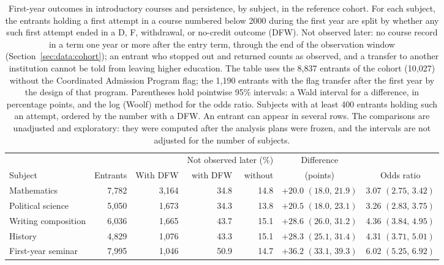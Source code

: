 \begin{table}[tbp]
\centering\footnotesize
\setlength{\tabcolsep}{4pt}
\caption{First-year outcomes in introductory courses and
  persistence, by subject, in the reference cohort. For each
  subject, the entrants holding a first attempt in a course
  numbered below 2000 during the first year are split by
  whether any such first attempt ended in a D, F, withdrawal, or
  no-credit outcome (DFW). Not observed later: no course record in
  a term one year or more after the entry term, through the end of
  the observation window (Section~\ref{sec:data:cohort}); an
  entrant who stopped out and returned counts as observed, and a
  transfer to another institution cannot be told from leaving
  higher education. The table uses the 8,837 entrants of the
  cohort (10,027) without the Coordinated Admission Program
  flag; the 1,190 entrants with the flag transfer after the
  first year by the design of that program. Parentheses hold
  pointwise 95\%
  intervals: a Wald interval for a difference, in percentage
  points, and the log (Woolf) method for the odds ratio. Subjects
  with at least 400 entrants holding such an attempt,
  ordered by the number with a DFW. An entrant can appear in
  several rows. The comparisons are unadjusted and exploratory:
  they were computed after the analysis plans were frozen, and
  the intervals are not adjusted for the number of subjects.}
\label{tab:persistencedfw}
\begin{tabular}{@{}lrrrrcc@{}}
\toprule
 & & & \multicolumn{2}{c}{Not observed later (\%)} & Difference & \\
\cmidrule(lr){4-5}
Subject & Entrants & With DFW & with DFW & without & (points) & Odds ratio \\
\midrule
Mathematics & 7,782 & 3,164 & 34.8 & 14.8 & $+20.0$ $(18.0,\,21.9)$ & 3.07 $(2.75,\,3.42)$ \\
Political science & 5,050 & 1,673 & 34.3 & 13.8 & $+20.5$ $(18.0,\,23.1)$ & 3.26 $(2.83,\,3.75)$ \\
Writing composition & 6,036 & 1,665 & 43.7 & 15.1 & $+28.6$ $(26.0,\,31.2)$ & 4.36 $(3.84,\,4.95)$ \\
History & 4,829 & 1,076 & 43.3 & 15.1 & $+28.3$ $(25.1,\,31.4)$ & 4.31 $(3.71,\,5.01)$ \\
First-year seminar & 7,995 & 1,046 & 50.9 & 14.7 & $+36.2$ $(33.1,\,39.3)$ & 6.02 $(5.25,\,6.92)$ \\

\end{tabular}
\end{table}
